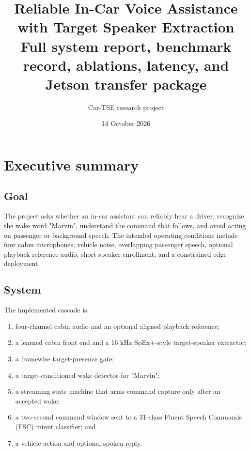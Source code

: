 \documentclass[11pt,a4paper]{article}
\title{\textbf{Reliable In-Car Voice Assistance with Target Speaker Extraction}\\
\large Full system report, benchmark record, ablations, latency, and Jetson transfer package}
\author{Car-TSE research project}
\date{14 October 2026}
\begin{document}
\maketitle

\begin{center}
\end{center}

\tableofcontents
\newpage

\section{Executive summary}

\subsection{Goal}

The project asks whether an in-car assistant can reliably hear a driver,
recognize the wake word "Marvin", understand the command that follows, and
avoid acting on passenger or background speech. The intended operating
conditions include four cabin microphones, vehicle noise, overlapping
passenger speech, optional playback reference audio, short speaker
enrollment, and a constrained edge deployment.

\subsection{System}

The implemented cascade is:

\begin{enumerate}[leftmargin=*]
  \item four-channel cabin audio and an optional aligned playback reference;
  \item a learned cabin front end and a 16 kHz SpEx+-style target-speaker
        extractor;
  \item a framewise target-presence gate;
  \item a target-conditioned wake detector for "Marvin";
  \item a streaming state machine that arms command capture only after an
        accepted wake;
  \item a two-second command window sent to a 31-class Fluent Speech
        Commands (FSC) intent classifier; and
  \item a vehicle action and optional spoken reply.
\end{enumerate}
\end{document}

